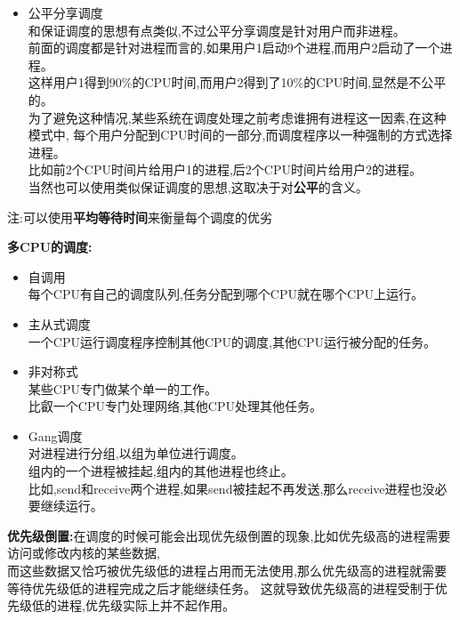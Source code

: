 \documentclass[UTF8,a4paper]{ctexart}
\newcommand{\spaceline}{\vspace{\baselineskip}}
\begin{document}
\begin{itemize}
      \item 公平分享调度\\
      和保证调度的思想有点类似,不过公平分享调度是针对用户而非进程。\\
      前面的调度都是针对进程而言的,如果用户1启动9个进程,而用户2启动了一个进程。\\
      这样用户1得到90\%的CPU时间,而用户2得到了10\%的CPU时间,显然是不公平的。\\
      为了避免这种情况,某些系统在调度处理之前考虑谁拥有进程这一因素,在这种模式中,
      每个用户分配到CPU时间的一部分,而调度程序以一种强制的方式选择进程。\\
      比如前2个CPU时间片给用户1的进程,后2个CPU时间片给用户2的进程。\\
      当然也可以使用类似保证调度的思想,这取决于对\textbf{公平}的含义。

    \end{itemize}

    注:可以使用\textbf{平均等待时间}来衡量每个调度的优劣

    \spaceline
    \textbf{多CPU的调度:}
    \begin{itemize}
      \item 自调用\\
      每个CPU有自己的调度队列,任务分配到哪个CPU就在哪个CPU上运行。
      \item 主从式调度\\
      一个CPU运行调度程序控制其他CPU的调度,其他CPU运行被分配的任务。
      \item 非对称式\\
      某些CPU专门做某个单一的工作。\\
      比叡一个CPU专门处理网络,其他CPU处理其他任务。
      \item Gang调度\\
      对进程进行分组,以组为单位进行调度。\\
      组内的一个进程被挂起,组内的其他进程也终止。\\
      比如,send和receive两个进程,如果send被挂起不再发送,那么receive进程也没必要继续运行。
    \end{itemize}

    \spaceline
    \textbf{优先级倒置:}在调度的时候可能会出现优先级倒置的现象,比如优先级高的进程需要访问或修改内核的某些数据,\\
    而这些数据又恰巧被优先级低的进程占用而无法使用,那么优先级高的进程就需要等待优先级低的进程完成之后才能继续任务。
    这就导致优先级高的进程受制于优先级低的进程,优先级实际上并不起作用。
\end{document}
